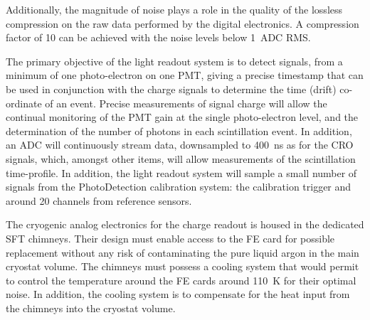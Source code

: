 Additionally, the magnitude of noise plays a role in the quality of the lossless compression on the raw data performed by the digital electronics. A compression factor of \num{10} can be achieved with the noise levels below \SI{1}{ADC} RMS.  %



The primary objective of the light readout system is to detect signals, from a minimum of one photo-electron on one PMT, giving a precise timestamp that can be used in conjunction with the charge signals to determine the time (drift) co-ordinate of an event.  Precise measurements of signal charge will allow the continual monitoring of the PMT gain at the single photo-electron level, and the determination of the number of photons in each scintillation event.  In addition, an ADC will continuously stream data, downsampled to \SI{400}{ns} as for the CRO signals,  which, amongst other items, will allow measurements of the scintillation time-profile. In addition, the light readout system will sample a small number of signals from the PhotoDetection calibration system: the calibration trigger and around \num{20} channels from reference sensors.

The cryogenic analog electronics for the charge readout is housed in the dedicated SFT chimneys. Their design must enable access to the FE card for possible replacement without any risk of contaminating the pure liquid argon in the main cryostat volume. The chimneys must possess a cooling system that would permit to control the temperature around the FE cards around \SI{110}{\kelvin} for their optimal noise. In addition, the cooling system is to compensate for the heat input from the chimneys into the cryostat volume.

